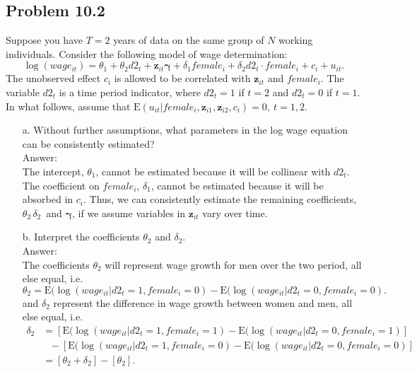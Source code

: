 \documentclass[10pt]{article}
\newcommand{\E}{\text{E}}
\begin{document}
\subsection*{Problem 10.2}
Suppose you have $T=2$ years of data on the same group of $N$ working individuals. Consider the following model of wage determination:
\[\log(wage_{it})=\theta_1+\theta_2d2_t+\textbf{z}_{it}\pmb{\gamma}+\delta_1 female_{i}+\delta_2 d2_t \cdot female_{i}+c_i+u_{it}.\]
The unobserved effect $c_i$ is allowed to be correlated with $\textbf{z}_{it}$ and $female_{i}$. The variable $d2_t$ is a time period indicator, where $d2_t=1$ if $t=2$ and $d2_t=0$ if $t=1$. In what follows, assume that $\E(u_{it}|female_i,\textbf{z}_{i1},\textbf{z}_{i2},c_i)=0,\ t=1,2.$
\begin{enumerate}
\item[a.] Without further assumptions, what parameters in the log wage equation can be consistently estimated? 
\\ Answer: \\
The intercept, $\theta_1$, cannot be estimated because it will be collinear with $d2_t$. The coefficient on $female_i$, $\delta_1$, cannot be estimated because it will be absorbed in $c_i$. Thus, we can consistently estimate the remaining coefficients, $\theta_2\, \delta_2\,$ and $\pmb{\gamma}$, if we assume variables in $\textbf{z}_{it}$ vary over time.

\item[b.] Interpret the coefficients $\theta_2$ and $\delta_2$. 
\\ Answer: \\
The coefficients $\theta_2$ will represent wage growth for men over the two period, all else equal, i.e. \[\theta_2=\E(\log(wage_{it}|d2_t=1,female_i=0)-\E(\log(wage_{it}|d2_t=0,female_i=0).\] and $\delta_2$ represent the difference in wage growth between women and men, all else equal, i.e. \begin{align*}
    \delta_2&=\left[\E(\log(wage_{it}|d2_t=1,female_i=1)-\E(\log(wage_{it}|d2_t=0,female_i=1)\right]\\
    &\ \ \ -\left[\E(\log(wage_{it}|d2_t=1,female_i=0)-\E(\log(wage_{it}|d2_t=0,female_i=0)\right]\\
    &=[\theta_2+\delta_2]-[\theta_2].
\end{align*}


\end{enumerate}
\end{document}

